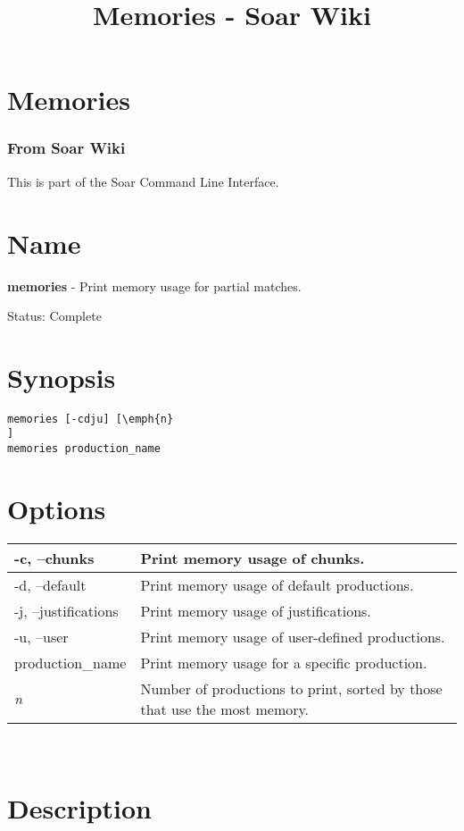 \documentclass[10pt]{article}
\title{Memories - Soar Wiki}
\begin{document}
\section*{Memories}
\subsubsection*{From Soar Wiki}


 This is part of the Soar Command Line Interface. 
\section*{ Name }


 \textbf{memories}
 - Print memory usage for partial matches. 


 Status: Complete
\section*{ Synopsis }
\begin{verbatim}
memories [-cdju] [\emph{n}
]
memories production_name 

\end{verbatim}
\section*{ Options }


\begin{tabular}{|p{1in}|p{5in}|}
\hline 
 -c, --chunks  & Print memory usage of chunks.  \\
 \hline 
 -d, --default  & Print memory usage of default productions.  \\
 \hline 
 -j, --justifications  & Print memory usage of justifications.  \\
 \hline 
 -u, --user  & Print memory usage of user-defined productions.  \\
 \hline 
production\_name & Print memory usage for a specific production.  \\
 \hline 
\emph{n}
 & Number of productions to print, sorted by those that use the most memory.  \\
 \hline 

\end{tabular}



 \\ 

\section*{ Description }
\end{document}

